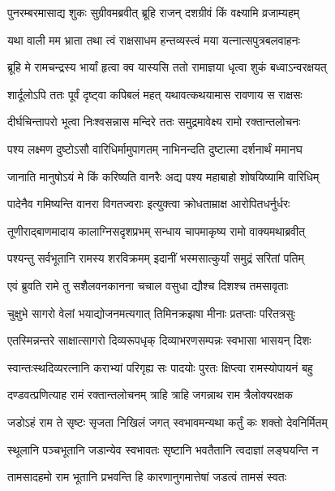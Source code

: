 \twolineshloka
{पुनरम्बरमासाद्य शुकः सुग्रीवमब्रवीत्}
{ब्रूहि राजन् दशग्रीवं किं वक्ष्यामि व्रजाम्यहम्} %


\twolineshloka
{यथा वाली मम भ्राता तथा त्वं राक्षसाधम}
{हन्तव्यस्त्वं मया यत्नात्सपुत्रबलवाहनः} %

\twolineshloka
{ब्रूहि मे रामचन्द्रस्य भार्यां हृत्वा क्व यास्यसि}
{ततो रामाज्ञया धृत्वा शुकं बध्वाऽन्वरक्षयत्} %

\twolineshloka
{शार्दूलोऽपि ततः पूर्वं दृष्ट्वा कपिबलं महत्}
{यथावत्कथयामास रावणाय स राक्षसः} %

\twolineshloka
{दीर्घचिन्तापरो भूत्वा निःश्वसन्नास मन्दिरे}
{ततः समुद्रमावेक्ष्य रामो रक्तान्तलोचनः} %

\twolineshloka
{पश्य लक्ष्मण दुष्टोऽसौ वारिधिर्मामुपागतम्}
{नाभिनन्दति दुष्टात्मा दर्शनार्थं ममानघ} %

\twolineshloka
{जानाति मानुषोऽयं मे किं करिष्यति वानरैः}
{अद्य पश्य महाबाहो शोषयिष्यामि वारिधिम्} %

\twolineshloka
{पादेनैव गमिष्यन्ति वानरा विगतज्वराः}
{इत्युक्त्वा क्रोधताम्राक्ष आरोपितधर्नुर्धरः} %

\twolineshloka
{तूणीराद्बाणमादाय कालाग्निसदृशप्रभम्}
{सन्धाय चापमाकृष्य रामो वाक्यमथाब्रवीत्} %

\twolineshloka
{पश्यन्तु सर्वभूतानि रामस्य शरविक्रमम्}
{इदानीं भस्मसात्कुर्यां समुद्रं सरितां पतिम्} %

\twolineshloka
{एवं ब्रुवति रामे तु सशैलवनकानना}
{चचाल वसुधा द्यौश्च दिशश्च तमसावृताः} %

\twolineshloka
{चुक्षुभे सागरो वेलां भयाद्योजनमत्यगात्}
{तिमिनक्रझषा मीनाः प्रतप्ताः परितत्रसुः} %

\twolineshloka
{एतस्मिन्नन्तरे साक्षात्सागरो दिव्यरूपधृक्}
{दिव्याभरणसम्पन्नः स्वभासा भासयन् दिशः} %

\twolineshloka
{स्वान्तःस्थदिव्यरत्नानि कराभ्यां परिगृह्य सः}
{पादयोः पुरतः क्षिप्त्वा रामस्योपायनं बहु} %

\twolineshloka
{दण्डवत्प्रणित्याह रामं रक्तान्तलोचनम्}
{त्राहि त्राहि जगन्नाथ राम त्रैलोक्यरक्षक} %

\twolineshloka
{जडोऽहं राम ते सृष्टः सृजता निखिलं जगत्}
{स्वभावमन्यथा कर्तुं कः शक्तो देवनिर्मितम्} %

\twolineshloka
{स्थूलानि पञ्चभूतानि जडान्येव स्वभावतः}
{सृष्टानि भवतैतानि त्वदाज्ञां लङ्घयन्ति न} %

\twolineshloka
{तामसादहमो राम भूतानि प्रभवन्ति हि}
{कारणानुगमात्तेषां जडत्वं तामसं स्वतः} %

